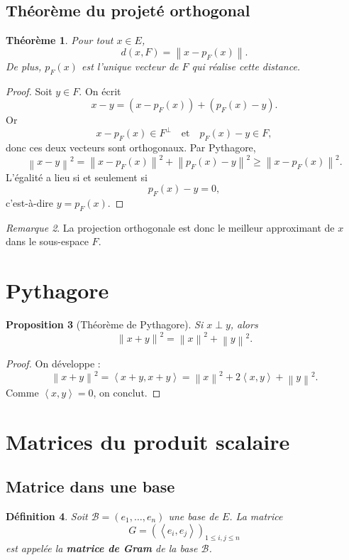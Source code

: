 \documentclass[11pt,a4paper]{article}
\newtheorem{definition}{Définition}[section]
\newtheorem{theoreme}[definition]{Théorème}
\newtheorem{proposition}[definition]{Proposition}
\theoremstyle{remark}
\newtheorem{remarque}[definition]{Remarque}
\newcommand{\Norm}[1]{\left\|#1\right\|}
\newcommand{\scal}[2]{\left\langle #1,#2\right\rangle}
\newcommand{\Orth}{\perp}
\begin{document}
\subsection{Théorème du projeté orthogonal}

\begin{theoreme}
Pour tout \(x\in E\),
\[
d(x,F)=\Norm{x-p_F(x)}.
\]
De plus, \(p_F(x)\) est l’unique vecteur de \(F\) qui réalise cette distance.
\end{theoreme}

\begin{proof}
Soit \(y\in F\). On écrit
\[
x-y=(x-p_F(x))+(p_F(x)-y).
\]
Or
\[
x-p_F(x)\in F^\Orth
\quad \text{et} \quad
p_F(x)-y\in F,
\]
donc ces deux vecteurs sont orthogonaux. Par Pythagore,
\[
\Norm{x-y}^2=\Norm{x-p_F(x)}^2+\Norm{p_F(x)-y}^2\ge \Norm{x-p_F(x)}^2.
\]
L’égalité a lieu si et seulement si
\[
p_F(x)-y=0,
\]
c’est-à-dire \(y=p_F(x)\).
\end{proof}

\begin{remarque}
La projection orthogonale est donc le meilleur approximant de \(x\) dans le sous-espace \(F\).
\end{remarque}

\section{Pythagore}

\begin{proposition}[Théorème de Pythagore]
Si \(x\Orth y\), alors
\[
\Norm{x+y}^2=\Norm{x}^2+\Norm{y}^2.
\]
\end{proposition}

\begin{proof}
On développe :
\[
\Norm{x+y}^2=\scal{x+y}{x+y}
=\Norm{x}^2+2\scal{x}{y}+\Norm{y}^2.
\]
Comme \(\scal{x}{y}=0\), on conclut.
\end{proof}

\section{Matrices du produit scalaire}

\subsection{Matrice dans une base}

\begin{definition}
Soit \(\mathcal B=(e_1,\dots,e_n)\) une base de \(E\). La matrice
\[
G=(\scal{e_i}{e_j})_{1\le i,j\le n}
\]
est appelée la \textbf{matrice de Gram} de la base \(\mathcal B\).
\end{definition}
\end{document}

